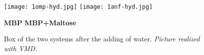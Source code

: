 \begin{itemize}

\begin{figure}[h]
\begin{center}
\begin{minipage}[t]{0.9\textwidth}
\centering
\hfill
\texttt{[image: 1omp-hyd.jpg]}
\hspace{0.5cm}
\texttt{[image: 1anf-hyd.jpg]}
\hfill
\end{minipage} 

\hspace{1cm}
\textbf{MBP}
\hspace{4.75cm}
\textbf{MBP+Maltose}

    \footnotesize{\caption{Box of the two systems after the adding of water. \textit{Picture realized with VMD.}}
    \label{fig:water-box}
    }
\end{center}
\end{figure}


\end{itemize}

